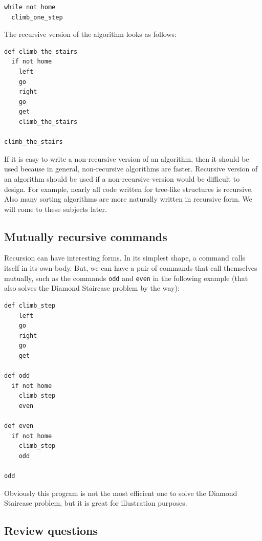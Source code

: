 \documentclass[article,A4,12pt]{llncs}
\begin{document}
{{{{\begin{verbatim}
while not home
  climb_one_step
\end{verbatim}
The recursive version of the algorithm looks as follows:

\begin{verbatim}
def climb_the_stairs
  if not home
    left
    go
    right
    go
    get
    climb_the_stairs

climb_the_stairs
\end{verbatim}
If it is easy to write a non-recursive version of an algorithm, then it should be used
because in general, non-recursive algorithms are faster. 
Recursive version of an algorithm should be used if a non-recursive version would 
be difficult to design. For example, nearly all code written for tree-like structures 
is recursive. Also many sorting algorithms are more naturally written in recursive form.
We will come to these subjects later.

\subsection{Mutually recursive commands}

Recursion can have interesting forms. In its simplest shape, a command 
calls itself in its own body. But, we can have a pair of commands
that call themselves mutually, such as the commands {\tt odd} and 
{\tt even} in the following example (that also solves the Diamond Staircase
problem by the way):
 
\begin{verbatim}
def climb_step
    left
    go
    right
    go
    get 

def odd
  if not home
    climb_step
    even
    
def even
  if not home
    climb_step
    odd
    
odd
\end{verbatim}
Obviously this program is not the most efficient one to solve the 
Diamond Staircase problem, but it is great for illustration purposes.

\subsection{Review questions}

}}}}
\end{document}
